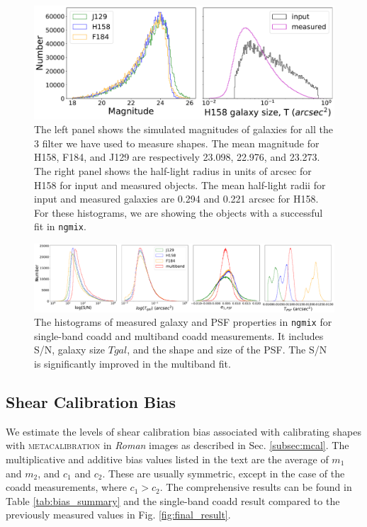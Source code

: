 \documentclass[fleqn,usenatbib]{mnras}
\begin{document}
\begin{figure}
	\includegraphics[width=\columnwidth]{true_properties.pdf}
	\centering
    \caption{The left panel shows the simulated magnitudes of galaxies for all the 3 filter we have used to measure shapes. The mean magnitude for H158, F184, and J129 are respectively 23.098, 22.976, and 23.273. The right panel shows the half-light radius in units of arcsec for H158 for input and measured objects. The mean half-light radii for input and measured galaxies are 0.294 and 0.221 arcsec for H158. For these histograms, we are showing the objects with a successful fit in \texttt{ngmix}.}
    \label{fig:true_properties}
\end{figure}

\begin{figure}
    \centering
	\includegraphics[width=\textwidth]{ngmix_snr_T.pdf}
    \caption{The histograms of measured galaxy and PSF properties in \texttt{ngmix} for single-band coadd and multiband coadd measurements. It includes S/N, galaxy size $T{gal}$, and the shape and size of the PSF. The S/N is significantly improved in the multiband fit.}
    \label{fig:measured_properties}
\end{figure}


\subsection{Shear Calibration Bias}
\label{subsec:shapes}
We estimate the levels of shear calibration bias associated with calibrating shapes with \textsc{metacalibration} in \emph{Roman} images as described in Sec. \ref{subsec:mcal}. The multiplicative and additive bias values listed in the text are the average of $m_{1}$ and $m_{2}$, and $c_{1}$ and $c_{2}$. These are usually symmetric, except in the case of the coadd measurements, where $c_1>c_2$. The comprehensive results can be found in Table \ref{tab:bias_summary} and the single-band coadd result compared to the previously measured values in Fig. \ref{fig:final_result}.  
\end{document}
